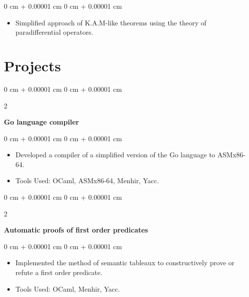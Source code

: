 \documentclass[10pt, letterpaper]{article}
\newenvironment{highlights}{
    \begin{itemize}[
        topsep=0.10 cm,
        parsep=0.10 cm,
        partopsep=0pt,
        itemsep=0pt,
        leftmargin=0 cm + 10pt
    ]
}{
    \end{itemize}
} %
\newenvironment{onecolentry}{
    \begin{adjustwidth}{
        0 cm + 0.00001 cm
    }{
        0 cm + 0.00001 cm
    }
}{
    \end{adjustwidth}
} %
\newenvironment{twocolentry}[2][]{
    \onecolentry
    \def\secondColumn{#2}
    \setcolumnwidth{\fill, 4.5 cm}
    \begin{paracol}{2}
}{
    \switchcolumn \raggedleft \secondColumn
    \end{paracol}
    \endonecolentry
} %
\begin{document}
        \vspace{0.10 cm}
        \begin{onecolentry}
            \begin{highlights}
                \item Simplified approach of K.A.M-like theorems using the theory of paradifferential operators.
            \end{highlights}
        \end{onecolentry}
        
        
    \section{Projects}

        
        \begin{twocolentry}{
        }
            \textbf{Go language compiler}\end{twocolentry}

        \vspace{0.10 cm}
        \begin{onecolentry}
            \begin{highlights}
                \item Developed a compiler of a simplified version of the Go language to ASMx86-64.
                \item Tools Used: OCaml, ASMx86-64, Menhir, Yacc.
            \end{highlights}
        \end{onecolentry}



        \vspace{0.2 cm}
        
        
        
        \begin{twocolentry}{
             }
            \textbf{Automatic proofs of first order predicates}\end{twocolentry}

        \vspace{0.10 cm}
        \begin{onecolentry}
            \begin{highlights}
                \item Implemented the method of semantic tableaux to constructively prove or refute a first order predicate.
                \item Tools Used: OCaml, Menhir, Yacc.
            \end{highlights}
        \end{onecolentry}
\end{document}

